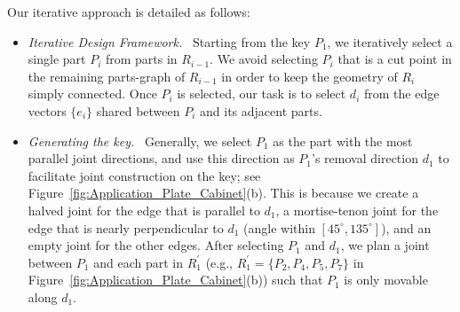  Our iterative approach is detailed as follows:
 \begin{itemize}[leftmargin=*]
\vspace{-0.5mm}
\item 
{\em Iterative Design Framework.} \
 Starting from the key $P_1$, we iteratively select a single part $P_i$  from parts in $R_{i-1}$.
We avoid selecting $P_i$ that is a cut point in the remaining parts-graph of $R_{i-1}$ in order to keep the geometry of $R_i$ simply connected.
Once $P_i$ is selected, our task is to select $d_i$ from the edge vectors $\{e_i\}$ shared between $P_i$ and its adjacent parts.





 
 \vspace{1mm}
\item 
{\em Generating the key.} \
Generally, we select $P_1$ as the part with the most parallel joint directions, and use this direction as $P_1$'s removal direction $d_1$ to facilitate joint construction on the key; see Figure~\ref{fig:Application_Plate_Cabinet}(b).
This is because we create a halved joint for the edge that is parallel to $d_1$, a mortise-tenon joint for the edge that is nearly perpendicular to $d_1$ (angle within $[45^\circ, 135^\circ]$), and an empty joint for the other edges.  
After selecting $P_1$ and $d_1$, we plan a joint between $P_1$ and each part in $R_1^{'}$ (e.g.,  $R_1^{'} = \{P_2, P_4, P_5, P_7\}$ in Figure~\ref{fig:Application_Plate_Cabinet}(b)) such that $P_1$ is only movable along $d_1$.



\end{itemize}
